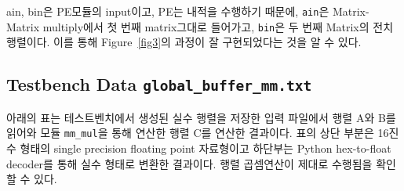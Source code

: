 \documentclass{article}
\begin{document}
ain, bin은 PE모듈의 input이고, PE는 내적을 수행하기 때문에, \texttt{ain}은 Matrix-Matrix multiply에서 첫 번째 matrix그대로 들어가고, \texttt{bin}은 두 번째 Matrix의 전치행렬이다. 이를 통해 Figure~\ref{fig3}의 과정이 잘 구현되었다는 것을 알 수 있다.

\subsection*{Testbench Data \texttt{global\_buffer\_mm.txt}}
아래의 표는 테스트벤치에서 생성된 실수 행렬을 저장한 입력 파일에서 행렬 A와 B를 읽어와 모듈 \texttt{mm\_mul}을 통해 연산한 행렬 C를 연산한 결과이다. 표의 상단 부분은 16진수 형태의 single precision floating point 자료형이고 하단부는 Python hex-to-float decoder를 통해 실수 형태로 변환한 결과이다. 행렬 곱셈연산이 제대로 수행됨을 확인할 수 있다.
\end{document}

